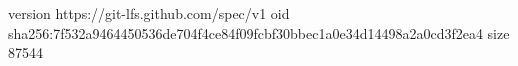 version https://git-lfs.github.com/spec/v1
oid sha256:7f532a9464450536de704f4ce84f09fcbf30bbec1a0e34d14498a2a0cd3f2ea4
size 87544
